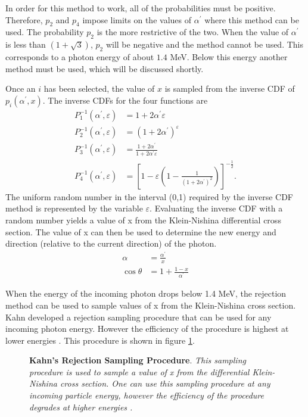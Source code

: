 In order for this method to work, all of the probabilities must be positive.
Therefore, $p_2$ and $p_4$ impose limits on the values of $\alpha^{'}$ where this
method can be used. The probability $p_2$ is the more restrictive of the two.
When the value of $\alpha^{'}$ is less than $(1 + \sqrt{3})$, $p_2$ will be 
negative and the method cannot be used. This corresponds to a photon energy of
about $1.4$ MeV. Below this energy another method must be used, which will be 
discussed shortly. 

Once an $i$ has been selected, the value of $x$ is sampled from the inverse CDF 
of $p_i(\alpha^{'},x)$. The inverse CDFs for the four functions are
\begin{align}
  P_1^{-1}(\alpha^{'},\varepsilon) & = 1 + 2\alpha^{'}\varepsilon \\
  P_2^{-1}(\alpha^{'},\varepsilon) & = (1 + 2\alpha^{'})^{\varepsilon} \\
  P_3^{-1}(\alpha^{'},\varepsilon) & = \frac{1 + 2\alpha^{'}}
  {1 + 2\alpha^{'}\varepsilon} \\
  P_4^{-1}(\alpha^{'},\varepsilon) & = \left[1 - \varepsilon\left(1 - 
    \frac{1}{(1 + 2\alpha^{'})^2} \right) \right]^{-\frac{1}{2}}.
\end{align}
The uniform random number in the interval (0,1) required by the inverse CDF 
method is represented by the variable $\varepsilon$. Evaluating the inverse CDF 
with a random number yields a value of x from the Klein-Nishina differential 
cross section. The value of x can then be used to determine the new energy and 
direction (relative to the current direction) of the photon.
\begin{align}
  \alpha & = \frac{\alpha^{'}}{x} \\
  \cos{\theta} & = 1 + \frac{1-x}{\alpha^{'}} 
\end{align}

When the energy of the incoming photon drops below 1.4 MeV, the rejection
method can be used to sample values of x from the Klein-Nishina cross section.
Kahn developed a rejection sampling procedure that can be used for any incoming
photon energy. However the efficiency of the procedure is highest at lower 
energies \citep{lux_monte_1991, kahn_applications_1956}. This procedure is
shown in figure \ref{fig:kahn_rejection_sampling}.
\begin{figure}[t!]
  \begin{center}
    \def\svgwidth{300bp}
    
  \end{center}
  \caption{\textbf{Kahn's Rejection Sampling Procedure}.
    \textit{This sampling procedure is used to sample a value of x from the
    differential Klein-Nishina cross section. One can use this sampling
    procedure at any incoming particle energy, however the efficiency of the
    procedure degrades at higher energies \citep{lux_monte_1991}.}}
  \label{fig:kahn_rejection_sampling}
\end{figure}

